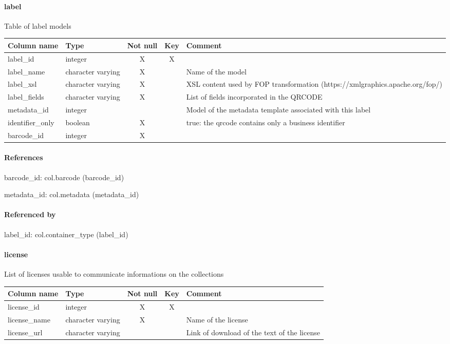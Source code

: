 \paragraph{label}
Table of label models

\begin{tabular}{|l| p{2cm}|c|c| p{5cm}|}
\hline
Column name & Type & Not null & Key & Comment \\
\hline
label\_id & integer & X & X & \\
label\_name & character varying & X &  & Name of the model\\
label\_xsl & character varying & X &  & XSL content used by FOP transformation (https://xmlgraphics.apache.org/fop/)\\
label\_fields & character varying & X &  & List of fields incorporated in the QRCODE\\
metadata\_id & integer &  &  & Model of the metadata template associated with this label\\
identifier\_only & boolean & X &  & true: the qrcode contains only a business identifier\\
barcode\_id & integer & X &  & \\
\hline
\end{tabular}
\paragraph{References}
barcode\_id: col.barcode (barcode\_id)

metadata\_id: col.metadata (metadata\_id)

\paragraph{Referenced by}
label\_id: col.container\_type (label\_id)

\paragraph{license}
List of licenses usable to communicate informations on the collections

\begin{tabular}{|l| p{2cm}|c|c| p{5cm}|}
\hline
Column name & Type & Not null & Key & Comment \\
\hline
license\_id & integer & X & X & \\
license\_name & character varying & X &  & Name of the license\\
license\_url & character varying &  &  & Link of download of the text of the license\\
\hline
\end{tabular}
